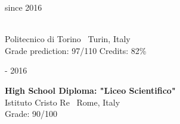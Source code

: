 \begin{minipage}{.3\textwidth}
	\flushright since 2016 \faCalendar
\end{minipage}
\hfill
\begin{minipage}{.65\textwidth}
	\vfill
	 \\
	\color{Maroon} Politecnico di Torino \hfill \color{Sepia} \faMapMarker \ Turin, Italy \\
	\color{gray} Grade prediction: 97/110 \hspace{25px} Credits: 82\% 
	\vfill
\end{minipage}

\bigskip

\begin{minipage}{.3\textwidth}
	 - 2016 \faCalendar
\end{minipage}
\hfill
\begin{minipage}{.64\textwidth}
	\vfill
	{\large \textbf{High School Diploma: "Liceo Scientifico"}} \\
	\color{Maroon} Istituto Cristo Re \hfill \color{Sepia} \faMapMarker \ Rome, Italy \\
	\color{gray} Grade: 90/100
	\vfill
\end{minipage}